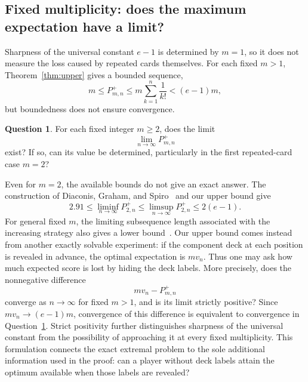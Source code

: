 \documentclass[11pt,reqno]{amsart}
\numberwithin{equation}{section}
\theoremstyle{remark}
\theoremstyle{definition}
\newtheorem{question}[theorem]{Question}
\begin{document}
\subsection{Fixed multiplicity: does the maximum expectation have a limit?}
Sharpness of the universal constant $e-1$ is determined by $m=1$, so it does not measure the loss caused by repeated cards themselves. For each fixed $m>1$, Theorem~\ref{thm:upper} gives a bounded sequence,
\[
 m\le P^+_{m,n}\le m\sum_{k=1}^{n}\frac1{k!}<(e-1)m,
\]
but boundedness does not ensure convergence.
\begin{question}\label{question:fixed-m}
For each fixed integer $m\ge2$, does the limit
\[
 \lim_{n\to\infty}P^+_{m,n}
\]
exist? If so, can its value be determined, particularly in the first repeated-card case $m=2$?
\end{question}
Even for $m=2$, the available bounds do not give an exact answer. The construction of Diaconis, Graham, and Spiro~\cite[Theorem~2]{DGS} and our upper bound give
\[
 2.91\le\liminf_{n\to\infty}P^+_{2,n}
 \le\limsup_{n\to\infty}P^+_{2,n}
 \le2(e-1).
\]
For general fixed $m$, the limiting subsequence length associated with the increasing strategy also gives a lower bound~\cite{CDHSY}. Our upper bound comes instead from another exactly solvable experiment: if the component deck at each position is revealed in advance, the optimal expectation is $mv_n$. Thus one may ask how much expected score is lost by hiding the deck labels. More precisely, does the nonnegative difference
\[
 mv_n-P^+_{m,n}
\]
converge as $n\to\infty$ for fixed $m>1$, and is its limit strictly positive? Since $mv_n\to(e-1)m$, convergence of this difference is equivalent to convergence in Question~\ref{question:fixed-m}. Strict positivity further distinguishes sharpness of the universal constant from the possibility of approaching it at every fixed multiplicity. This formulation connects the exact extremal problem to the sole additional information used in the proof: can a player without deck labels attain the optimum available when those labels are revealed?
\end{document}
